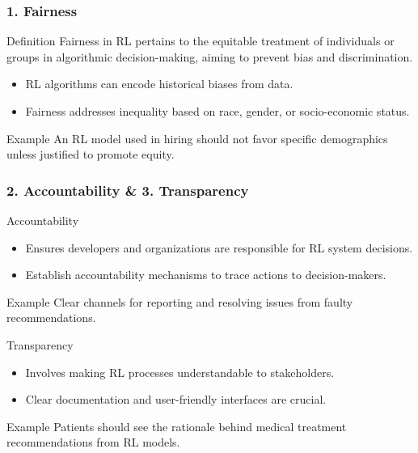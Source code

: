 \documentclass[aspectratio=169]{beamer}
\begin{document}
\begin{frame}[fragile]
  \frametitle{1. Fairness}
  \begin{block}{Definition}
    Fairness in RL pertains to the equitable treatment of individuals or groups in algorithmic decision-making, aiming to prevent bias and discrimination.
  \end{block}
  \begin{itemize}
    \item RL algorithms can encode historical biases from data.
    \item Fairness addresses inequality based on race, gender, or socio-economic status.
  \end{itemize}
  \begin{block}{Example}
    An RL model used in hiring should not favor specific demographics unless justified to promote equity.
  \end{block}
\end{frame}

\begin{frame}[fragile]
  \frametitle{2. Accountability \& 3. Transparency}
  \begin{block}{Accountability}
    \begin{itemize}
      \item Ensures developers and organizations are responsible for RL system decisions.
      \item Establish accountability mechanisms to trace actions to decision-makers.
    \end{itemize}
    \begin{block}{Example}
      Clear channels for reporting and resolving issues from faulty recommendations.
    \end{block}
  \end{block}

  \begin{block}{Transparency}
    \begin{itemize}
      \item Involves making RL processes understandable to stakeholders.
      \item Clear documentation and user-friendly interfaces are crucial.
    \end{itemize}
    \begin{block}{Example}
      Patients should see the rationale behind medical treatment recommendations from RL models.
    \end{block}
  \end{block}
\end{frame}
\end{document}
